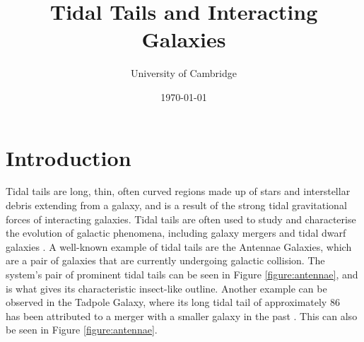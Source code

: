 \documentclass[twoside,twocolumn]{article}
\title{Tidal Tails and Interacting Galaxies} %
\author{%
    \normalsize University of Cambridge \\ %
    }
\date{
    \today \\
} %
\begin{document}
\maketitle

\section{Introduction}
    Tidal tails are long, thin, often curved regions made up of stars and interstellar debris extending from a galaxy, and is a result of the strong tidal gravitational forces of interacting galaxies. Tidal tails are often used to study and characterise the evolution of galactic phenomena, including galaxy mergers and tidal dwarf galaxies \cite{alavi}. A well-known example of tidal tails are the Antennae Galaxies, which are a pair of galaxies that are currently undergoing galactic collision. The system's pair of prominent tidal tails can be seen in Figure \ref{figure:antennae}, and is what gives its characteristic insect-like outline. Another example can be observed in the Tadpole Galaxy, where its long tidal tail of approximately \SI{86}{\kilo\parsec} has been attributed to a merger with a smaller galaxy in the past \cite{tadpole}. This can also be seen in Figure \ref{figure:antennae}.   
    
\end{document}

